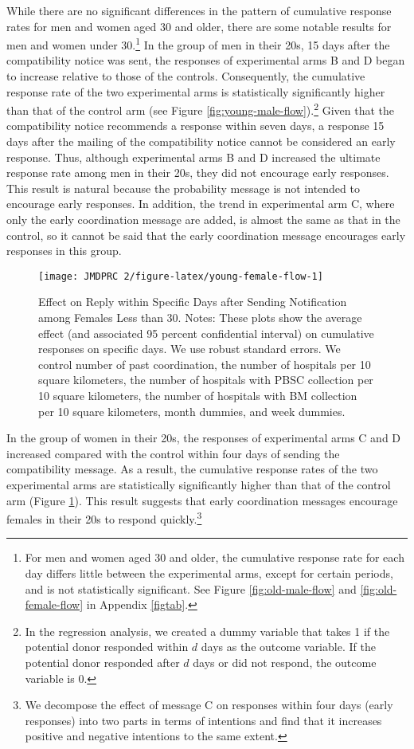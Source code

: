 \documentclass[12pt, a4paper]{article}
\begin{document}
While there are no significant differences in the pattern of cumulative response rates for men and women aged 30 and older, there are some notable results for men and women under 30.\footnote{For men and women aged 30 and older, the cumulative response rate for each day differs little between the experimental arms, except for certain periods, and is not statistically significant. See Figure \ref{fig:old-male-flow} and \ref{fig:old-female-flow} in Appendix \ref{figtab}.} In the group of men in their 20s, 15 days after the compatibility notice was sent, the responses of experimental arms B and D began to increase relative to those of the controls. Consequently, the cumulative response rate of the two experimental arms is statistically significantly higher than that of the control arm (see Figure \ref{fig:young-male-flow}).\footnote{In the regression analysis, we created a dummy variable that takes 1 if the potential donor responded within \(d\) days as the outcome variable. If the potential donor responded after \(d\) days or did not respond, the outcome variable is 0.} Given that the compatibility notice recommends a response within seven days, a response 15 days after the mailing of the compatibility notice cannot be considered an early response. Thus, although experimental arms B and D increased the ultimate response rate among men in their 20s, they did not encourage early responses. This result is natural because the probability message is not intended to encourage early responses. In addition, the trend in experimental arm C, where only the early coordination message are added, is almost the same as that in the control, so it cannot be said that the early coordination message encourages early responses in this group.

\begin{figure}[t]
\texttt{[image: JMDPRC~2/figure-latex/young-female-flow-1]} \caption{Effect on Reply within Specific Days after Sending Notification among Females Less than 30. Notes: These plots show the average effect (and associated 95 percent confidential interval) on cumulative responses on specific days. We use robust standard errors. We control number of past coordination, the number of hospitals per 10 square kilometers, the number of hospitals with PBSC collection per 10 square kilometers, the number of hospitals with BM collection per 10 square kilometers, month dummies, and week dummies.}\label{fig:young-female-flow}
\end{figure}

In the group of women in their 20s, the responses of experimental arms C and D increased compared with the control within four days of sending the compatibility message. As a result, the cumulative response rates of the two experimental arms are statistically significantly higher than that of the control arm (Figure \ref{fig:young-female-flow}). This result suggests that early coordination messages encourage females in their 20s to respond quickly.\footnote{We decompose the effect of message C on responses within four days (early responses) into two parts in terms of intentions and find that it increases positive and negative intentions to the same extent.}
\end{document}
